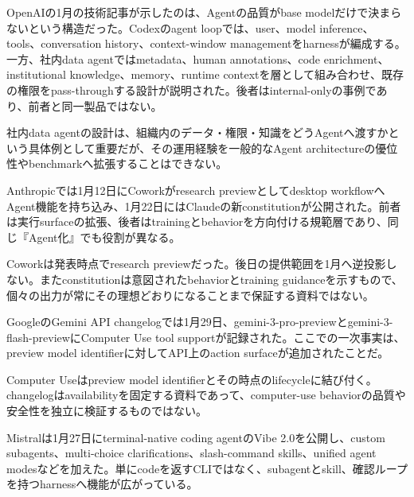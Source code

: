 
OpenAIの1月の技術記事が示したのは、Agentの品質がbase modelだけで決まらないという構造だった。Codexのagent loopでは、user、model inference、tools、conversation history、context-window managementをharnessが編成する。一方、社内data agentではmetadata、human annotations、code enrichment、institutional knowledge、memory、runtime contextを層として組み合わせ、既存の権限をpass-throughする設計が説明された。後者はinternal-onlyの事例であり、前者と同一製品ではない。\autocite{src-ae10eb4597fe,src-fa5410010e0a}


\begin{claimboundary}
社内data agentの設計は、組織内のデータ・権限・知識をどうAgentへ渡すかという具体例として重要だが、その運用経験を一般的なAgent architectureの優位性やbenchmarkへ拡張することはできない。\autocite{src-ae10eb4597fe,src-fa5410010e0a}
\end{claimboundary}

Anthropicでは1月12日にCoworkがresearch previewとしてdesktop workflowへAgent機能を持ち込み、1月22日にはClaudeの新constitutionが公開された。前者は実行surfaceの拡張、後者はtrainingとbehaviorを方向付ける規範層であり、同じ『Agent化』でも役割が異なる。\autocite{src-f6aa679babd7}


\begin{claimboundary}
Coworkは発表時点でresearch previewだった。後日の提供範囲を1月へ逆投影しない。またconstitutionは意図されたbehaviorとtraining guidanceを示すもので、個々の出力が常にその理想どおりになることまで保証する資料ではない。\autocite{src-f6aa679babd7}
\end{claimboundary}

GoogleのGemini API changelogでは1月29日、gemini-3-pro-previewとgemini-3-flash-previewにComputer Use tool supportが記録された。ここでの一次事実は、preview model identifierに対してAPI上のaction surfaceが追加されたことだ。\autocite{src-a24fd97eb3d0}


\begin{claimboundary}
Computer Useはpreview model identifierとその時点のlifecycleに結び付く。changelogはavailabilityを固定する資料であって、computer-use behaviorの品質や安全性を独立に検証するものではない。\autocite{src-a24fd97eb3d0}
\end{claimboundary}

Mistralは1月27日にterminal-native coding agentのVibe 2.0を公開し、custom subagents、multi-choice clarifications、slash-command skills、unified agent modesなどを加えた。単にcodeを返すCLIではなく、subagentとskill、確認ループを持つharnessへ機能が広がっている。\autocite{src-d8b7c1c36830}


